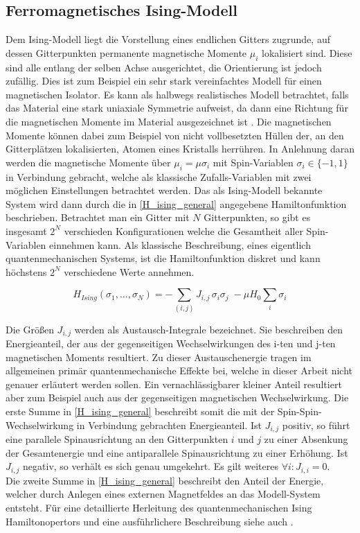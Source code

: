 \subsection{Ferromagnetisches Ising-Modell} \label{sec: Ferromagnetisches Ising-Modell}

Dem Ising-Modell liegt die Vorstellung eines endlichen Gitters zugrunde, auf dessen Gitterpunkten permanente magnetische Momente $\mu_i$ lokalisiert sind. Diese sind alle entlang der selben Achse ausgerichtet, die Orientierung ist jedoch zufällig. Dies ist zum Beispiel ein sehr stark vereinfachtes Modell für einen magnetischen Isolator. Es kann als halbwegs realistisches Modell betrachtet, falls das Material eine stark uniaxiale Symmetrie aufweist, da dann eine Richtung für die magnetischen Momente im Material ausgezeichnet ist \cite{StatPhys_Nolting_K4}. Die magnetischen Momente können dabei zum Beispiel von nicht vollbesetzten Hüllen der, an den Gitterplätzen lokalisierten, Atomen eines Kristalls herrühren. In Anlehnung daran werden die magnetische Momente über $\mu_i = \mu \sigma_i$  mit Spin-Variablen $\sigma_i \in \{-1, 1\}$ in Verbindung gebracht, welche als klassische Zufalls-Variablen mit zwei möglichen Einstellungen betrachtet werden. Das als Ising-Modell bekannte System wird dann durch die in \eqref{H_ising_general} angegebene Hamiltonfunktion beschrieben. Betrachtet man ein Gitter mit $N$ Gitterpunkten, so gibt es insgesamt $2^N$ verschieden Konfigurationen welche die Gesamtheit aller Spin-Variablen einnehmen kann. Als klassische Beschreibung, eines eigentlich quantenmechanischen Systems, ist die Hamiltonfunktion diskret und kann höchstens $2^N$ verschiedene Werte annehmen. 

\begin{equation} \label{H_ising_general}
H_{Ising}(\sigma_1, \dots, \sigma_N) = - \sum_{(i,j)} J_{i,j} \,\sigma_i \sigma_j \;- \mu H_0 \sum_{i} \sigma_i 
\end{equation}

\noindent Die Größen $J_{i,j}$ werden als Austausch-Integrale bezeichnet. Sie beschreiben den Energieanteil, der aus der gegenseitigen Wechselwirkungen des i-ten und j-ten magnetischen Moments resultiert. Zu dieser Austauschenergie tragen im allgemeinen primär quantenmechanische Effekte bei, welche in dieser Arbeit nicht genauer erläutert werden sollen. Ein vernachlässigbarer kleiner Anteil resultiert aber zum Beispiel auch aus der gegenseitigen magnetischen Wechselwirkung. Die erste Summe in \eqref{H_ising_general} beschreibt somit die mit der Spin-Spin-Wechselwirkung in Verbindung gebrachten Energieanteil. Ist $J_{i,j}$ positiv, so führt eine parallele Spinausrichtung an den Gitterpunkten $i$ und $j$ zu einer Absenkung der Gesamtenergie und eine antiparallele Spinausrichtung zu einer Erhöhung. Ist $J_{i,j}$ negativ, so verhält es sich genau umgekehrt. Es gilt weiteres $\forall i : J_{i,i} = 0$. \\
\noindent Die zweite Summe in \eqref{H_ising_general} beschreibt den Anteil der Energie, welcher durch Anlegen eines externen Magnetfeldes an das Modell-System entsteht.
Für eine detaillierte Herleitung des quantenmechanischen Ising Hamiltonopertors und eine ausführlichere Beschreibung siehe auch \cite{MarxGross2014}.\\

